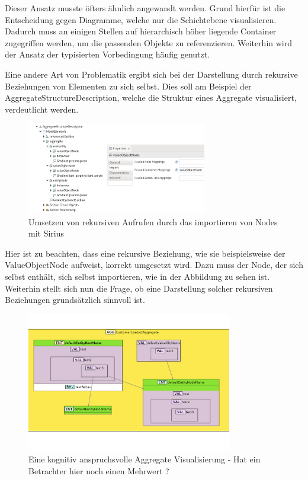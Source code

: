 Dieser Ansatz musste öfters ähnlich angewandt werden. Grund hierfür ist die Entscheidung gegen Diagramme, welche nur die Schichtebene visualisieren. Dadurch muss an einigen Stellen auf hierarchisch höher liegende Container zugegriffen werden, um die passenden Objekte zu referenzieren. Weiterhin wird der Ansatz der typisierten Vorbedingung häufig genutzt.

Eine andere Art von Problematik ergibt sich bei der Darstellung durch rekursive Beziehungen von Elementen zu sich selbst. Dies soll am Beispiel der \glqq AggregateStructureDescription\grqq{}, welche die Struktur eines Aggregate visualisiert, verdeutlicht werden.

\newpage

\begin{figure}[ht]
\centering
\includegraphics[width=0.7\textwidth]{bilder/k5/7.png}
\caption{Umsetzen von rekursiven Aufrufen durch das importieren von Nodes mit Sirius}
\end{figure}

Hier ist zu beachten, dass eine rekursive Beziehung, wie sie beispielsweise der ValueObjectNode aufweist, korrekt umgesetzt wird. Dazu muss der Node, der sich selbst enthält, sich selbst importieren, wie in der Abbildung zu sehen ist. Weiterhin stellt sich nun die Frage, ob eine Darstellung solcher rekursiven Beziehungen grundsätzlich sinnvoll ist.

\begin{figure}[ht]
\centering
\includegraphics[width=0.8\textwidth]{bilder/k5/8.png}
\caption[Eine kognitiv anspruchsvolle Aggregate Visualisierung]{Eine kognitiv anspruchsvolle Aggregate Visualisierung - Hat ein Betrachter hier noch einen Mehrwert ?}
\end{figure}

